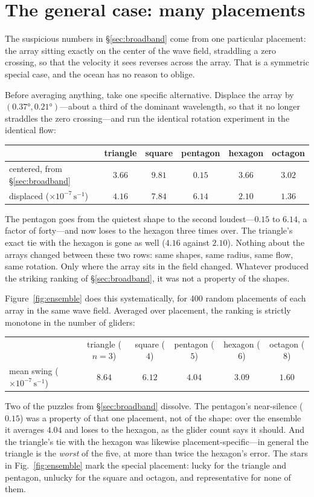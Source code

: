 \documentclass[11pt]{article}
\newcommand{\uu}{\times10^{-7}\,\mathrm{s}^{-1}}
\begin{document}
\section{The general case: many placements}
\label{sec:general}

The suspicious numbers in \S\ref{sec:broadband} come from one particular placement: the array
sitting exactly on the center of the wave field, straddling a zero crossing, so that the
velocity it sees reverses across the array. That is a symmetric special case, and the ocean has
no reason to oblige.

Before averaging anything, take one specific alternative. Displace the array by
$(0.37\si{\degree},0.21\si{\degree})$---about a third of the dominant wavelength, so that it no
longer straddles the zero crossing---and run the identical rotation experiment in the identical
flow:
\begin{center}
\small
\begin{tabular}{@{}lccccc@{}}
\toprule
 & triangle & square & pentagon & hexagon & octagon \\
\midrule
centered, from \S\ref{sec:broadband} & $3.66$ & $9.81$ & $0.15$ & $3.66$ & $3.02$ \\
displaced ($\uu$)                    & $4.16$ & $7.84$ & $6.14$ & $2.10$ & $1.36$ \\
\bottomrule
\end{tabular}
\end{center}
The pentagon goes from the quietest shape to the second loudest---$0.15$ to $6.14$, a factor of
forty---and now loses to the hexagon three times over. The triangle's exact tie with the hexagon
is gone as well ($4.16$ against $2.10$). Nothing about the arrays changed between these two rows:
same shapes, same radius, same flow, same rotation. Only where the array sits in the field
changed. Whatever produced the striking ranking of \S\ref{sec:broadband}, it was not a property
of the shapes.

Figure~\ref{fig:ensemble} does this systematically, for 400 random placements of each array in
the same wave field. Averaged over placement, the ranking is strictly monotone in the number of
gliders:
\begin{center}
\small
\begin{tabular}{@{}lccccc@{}}
\toprule
 & triangle ($n=3$) & square ($4$) & pentagon ($5$) & hexagon ($6$) & octagon ($8$) \\
mean swing ($\uu$) & $8.64$ & $6.12$ & $4.04$ & $3.09$ & $1.60$ \\
\bottomrule
\end{tabular}
\end{center}
Two of the puzzles from \S\ref{sec:broadband} dissolve. The pentagon's near-silence
($0.15$) was a property of that one placement, not of the shape: over the ensemble it averages
$4.04$ and loses to the hexagon, as the glider count says it should. And the triangle's tie with
the hexagon was likewise placement-specific---in general the triangle is the \emph{worst} of the
five, at more than twice the hexagon's error. The stars in Fig.~\ref{fig:ensemble} mark the
special placement: lucky for the triangle and pentagon, unlucky for the square and octagon, and
representative for none of them.
\end{document}

